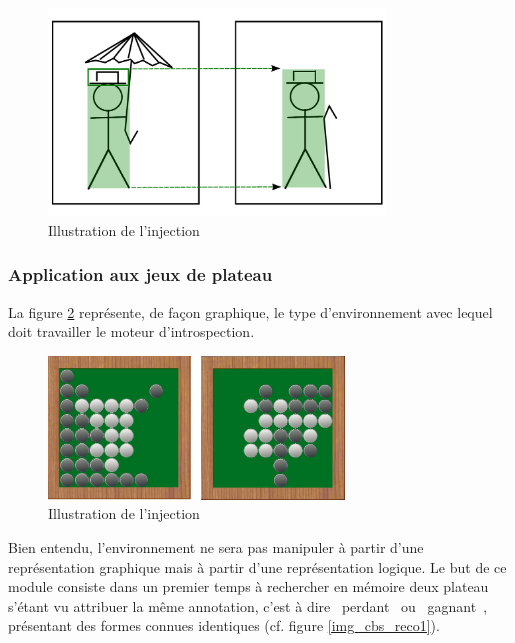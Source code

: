 \begin{figure}[H] 
\begin{center}
\includegraphics[width=0.8\textwidth]{files/raisonneur/reconnaissance_de_formes_injection} 
\end{center}
\caption{Illustration de l'injection} 
\label{img_reco_forme_injection}
\end{figure}

\subsubsection{Application aux jeux de plateau}

La figure \ref{img_cbs_reco0} représente, de façon graphique, le type d'environnement avec lequel doit travailler le moteur d'introspection.

\begin{figure}[H] 
\begin{center}
\includegraphics[width=0.7\textwidth]{files/raisonneur/cbs_reco0} 
\end{center}
\caption{Illustration de l'injection} 
\label{img_cbs_reco0}
\end{figure}

Bien entendu, l'environnement ne sera pas manipuler à partir d'une représentation graphique mais à partir d'une représentation logique. Le but de ce module consiste dans un premier temps à rechercher en mémoire deux plateau s'étant vu attribuer la même annotation, c'est à dire \og{}~perdant~\fg{} ou \og{}~gagnant~\fg{}, présentant des formes connues identiques (cf. figure \ref{img_cbs_reco1}).

